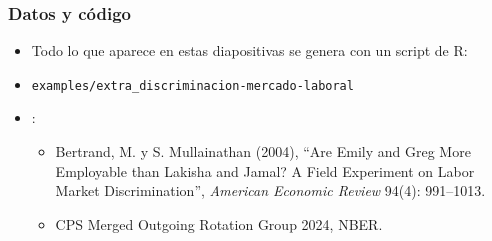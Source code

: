 \documentclass[t, compress, spanish, aspectratio=169]{beamer}
\newcommand{\term}[1]{\structure{\textbf{#1}}} %
\begin{document}
	\begin{frame}
		\frametitle{Datos y c\'odigo}
		\small
		\begin{itemize}
			\item Todo lo que aparece en estas diapositivas se genera con un script de R:
			\item [] \texttt{examples/extra\_discriminacion-mercado-laboral}
			\item \term{Fuentes}:
			\begin{itemize}
				\item Bertrand, M. y S. Mullainathan (2004), ``Are Emily and Greg More Employable than Lakisha and Jamal? A Field Experiment on Labor Market Discrimination'', \emph{American Economic Review} 94(4): 991--1013.
				\item CPS Merged Outgoing Rotation Group 2024, NBER.
			\end{itemize}
		\end{itemize}
	\end{frame}
\end{document}
